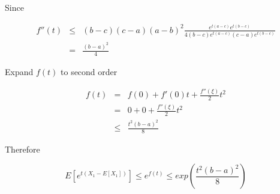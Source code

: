 \documentclass[UTF8]{ctexart}
\begin{document}
Since\par
\begin{eqnarray*}
f''(t)&\leq&(b-c)(c-a)(a-b)^{2}\frac{e^{t(a-c)}e^{t(b-c)}}{4(b-c)e^{t(a-c)}(c-a)e^{t(b-c)}}\\
&=&\frac{(b-a)^{2}}{4}
\end{eqnarray*}\par
Expand $f(t)$ to second order\par
\begin{eqnarray*}
f(t)&=&f(0)+f'(0)t+\frac{f''(\xi)}{2}t^{2}\\
&=&0+0+\frac{f''(\xi)}{2}t^{2}\\
&\leq&\frac{t^{2}(b-a)^{2}}{8}
\end{eqnarray*}\par
Therefore\par
\begin{equation*}
E[e^{t(X_{1}-E[X_{1}])}]\leq e^{f(t)}\leq exp(\frac{t^{2}(b-a)^{2}}{8})
\end{equation*}\par
\end{document}
